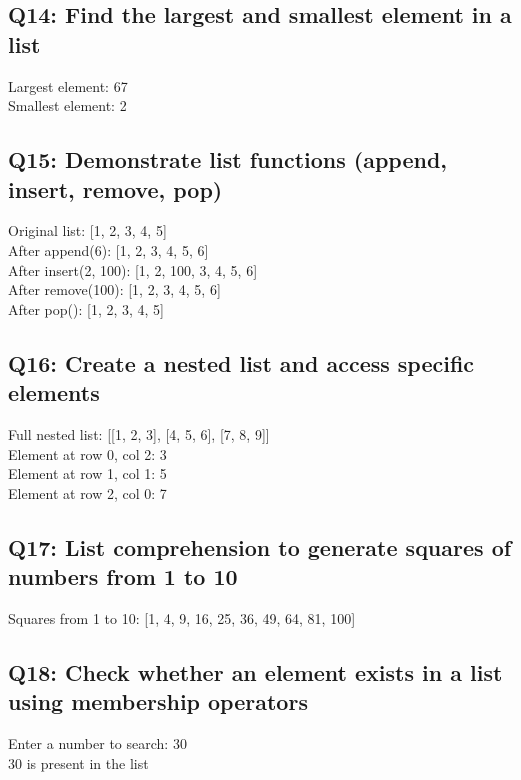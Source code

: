\documentclass[11pt,a4paper]{article}
\begin{document}
\subsection{Q14: Find the largest and smallest element in a list}
\begin{outputbox}
Largest element: 67\\
Smallest element: 2
\end{outputbox}

\subsection{Q15: Demonstrate list functions (append, insert, remove, pop)}
\begin{outputbox}
Original list: [1, 2, 3, 4, 5]\\
After append(6): [1, 2, 3, 4, 5, 6]\\
After insert(2, 100): [1, 2, 100, 3, 4, 5, 6]\\
After remove(100): [1, 2, 3, 4, 5, 6]\\
After pop(): [1, 2, 3, 4, 5]
\end{outputbox}

\subsection{Q16: Create a nested list and access specific elements}
\begin{outputbox}
Full nested list: [[1, 2, 3], [4, 5, 6], [7, 8, 9]]\\
Element at row 0, col 2: 3\\
Element at row 1, col 1: 5\\
Element at row 2, col 0: 7
\end{outputbox}

\subsection{Q17: List comprehension to generate squares of numbers from 1 to 10}
\begin{outputbox}
Squares from 1 to 10: [1, 4, 9, 16, 25, 36, 49, 64, 81, 100]
\end{outputbox}

\subsection{Q18: Check whether an element exists in a list using membership operators}
\begin{outputbox}
Enter a number to search: 30\\
30 is present in the list
\end{outputbox}
\end{document}
